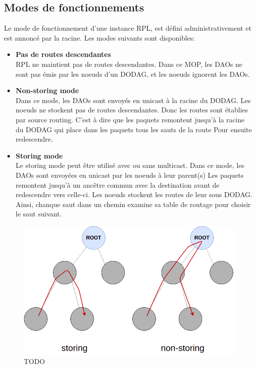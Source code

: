 \subsection*{Modes de fonctionnements}\label{subsec:state-mop}
    Le mode de fonctionnement d'une instance RPL, est défini administrativement et est annoncé par la racine. Les modes suivants sont disponibles:
    \begin{itemize}
        \item \textbf{Pas de routes descendantes}\\
            RPL ne maintient pas de routes descendantes. Dans ce MOP, les DAOs ne sont pas émis par les noeuds d'un DODAG, et les noeuds ignorent les DAOs.
        \item \textbf{Non-storing mode}\\
            Dans ce mode, les DAOs sont envoyés en unicast à la racine du DODAG.
            Les noeuds ne stockent pas de routes descendantes. Donc les routes sont établies par source routing. C'est à dire que les paquets remontent jusqu'à la racine du DODAG qui place dans les paquets tous les sauts de la route
            Pour ensuite redescendre.
        \item \textbf{Storing mode}\\
            Le storing mode peut être utilisé avec ou sans multicast.
            Dans ce mode, les DAOs sont envoyées en unicast par les noeuds à leur parent(s)
            Les paquets remontent jusqu'à un ancêtre commun avec la destination avant de redescendre vers celle-ci.
            Les noeuds stockent les routes de leur sous DODAG. Ainsi, chanque saut dans un chemin examine sa table de routage pour choisir le saut suivant.
    \end{itemize}
    \begin{figure}[H]
        \centering
        \includegraphics[scale=0.4]{res/storing-nonstoring.drawio.png}
        \caption{TODO}
        \label{fig:state:TODO}
    \end{figure}

